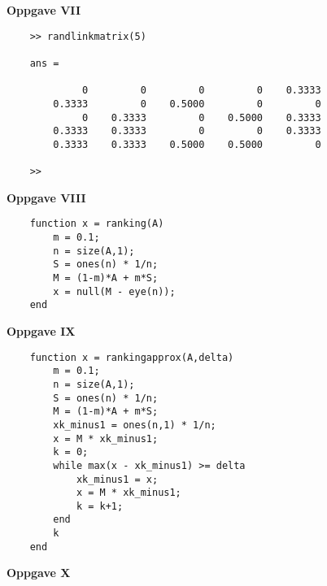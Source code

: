 \documentclass{article}%
\begin{document}
\begin{tcolorbox}[colframe=white]
    \textbf{Oppgave VII}
\end{tcolorbox}
\begin{tcolorbox}[colframe=white]
    \scriptsize
    \begin{verbatim}
    >> randlinkmatrix(5)

    ans =
        
             0         0         0         0    0.3333
        0.3333         0    0.5000         0         0
             0    0.3333         0    0.5000    0.3333
        0.3333    0.3333         0         0    0.3333
        0.3333    0.3333    0.5000    0.5000         0
        
    >> 
\end{verbatim}
\end{tcolorbox}
\begin{figure}[!htb]
    \centering
    \resizebox{0.28\textwidth}{!}{}
\end{figure}
\begin{tcolorbox}[colframe=white]
    \textbf{Oppgave VIII}
\end{tcolorbox}
\begin{tcolorbox}[colframe=white]
    \scriptsize
    \begin{verbatim}
    function x = ranking(A)
        m = 0.1;
        n = size(A,1);
        S = ones(n) * 1/n;
        M = (1-m)*A + m*S;
        x = null(M - eye(n));
    end
\end{verbatim}
\end{tcolorbox}
\begin{tcolorbox}[colframe=white]
    \textbf{Oppgave IX}
\end{tcolorbox}
\begin{tcolorbox}[colframe=white]
    \scriptsize
    \begin{verbatim}
    function x = rankingapprox(A,delta)
        m = 0.1;
        n = size(A,1);
        S = ones(n) * 1/n;
        M = (1-m)*A + m*S;
        xk_minus1 = ones(n,1) * 1/n;
        x = M * xk_minus1;
        k = 0;
        while max(x - xk_minus1) >= delta
            xk_minus1 = x;
            x = M * xk_minus1;
            k = k+1;
        end
        k
    end
\end{verbatim}
\end{tcolorbox}
\begin{tcolorbox}[colframe=white]
    \textbf{Oppgave X}
\end{tcolorbox}
\end{document}
